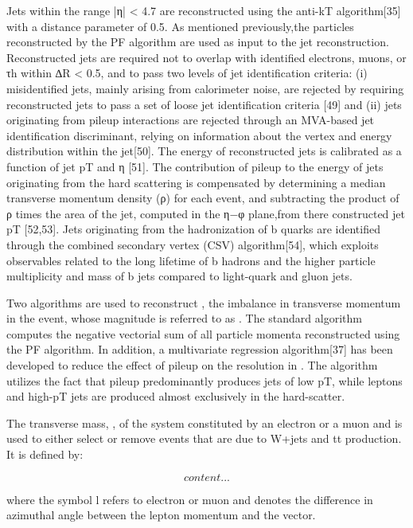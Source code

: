 Jets within the range |η| < 4.7 are reconstructed using the anti-kT algorithm[35] with a distance parameter of 0.5. As mentioned previously,the particles reconstructed by the PF algorithm are used as input to the jet reconstruction. Reconstructed jets are required not to overlap with identified electrons, muons, or τh within ∆R < 0.5, and to pass two levels of jet identification criteria: (i) misidentified jets, mainly arising from calorimeter noise, are rejected by requiring reconstructed jets to pass a set of loose jet identification criteria [49] and (ii) jets originating from pileup interactions are rejected through an MVA-based jet identification discriminant, relying on information about the vertex and energy distribution within the jet[50]. The energy of reconstructed jets is calibrated as a function of jet pT and η [51]. The contribution of pileup to the energy of jets originating from the hard scattering is compensated by determining a median transverse momentum density (ρ) for each event, and subtracting the product of ρ times the area of the jet, computed in the η−φ plane,from there constructed jet pT [52,53]. Jets originating from the hadronization of b quarks are identiﬁed through the combined secondary vertex (CSV) algorithm[54], which exploits observables related to the long lifetime of b hadrons and the higher particle multiplicity and mass of b jets compared to light-quark and gluon jets.

Two algorithms are used to reconstruct \ptvecmiss , the imbalance in transverse momentum in the event, whose magnitude is referred to as \met . The standard algorithm computes the negative vectorial sum of all particle momenta reconstructed using the PF algorithm. In addition, a multivariate regression algorithm[37] has been developed to reduce the effect of pileup on the resolution in \met. The algorithm utilizes the fact that pileup predominantly produces jets of low pT, while leptons and high-pT jets are produced almost exclusively in the hard-scatter. 

The transverse mass, \mt, of the system constituted by an electron or a muon and \met is used to either select or remove events that are due to W+jets and tt production. It is deﬁned by: 

\begin{equation}
content...
\end{equation}

where the symbol l refers to electron or muon and \deltaphi denotes the difference in azimuthal angle between the lepton momentum and the \ptvecmiss vector.

